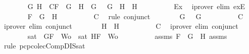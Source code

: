 \begin{isabellebody}
\ \ \ \ \ \ \isamarkupfalse%
\ G{}\ H{}\ \ C{}{\isacharcolon}{\isachardoublequoteopen}F\ {\isacharequal}\ G{}\ \isactrlbold {\isasymrightarrow}\ H{}\ {\isasymand}\ G\ {\isacharequal}\ \isactrlbold {\isasymnot}\ G{}\ {\isasymand}\ H\ {\isacharequal}\ H{}{\isachardoublequoteclose}\isanewline
\ \ \ \ \ \ \ \ \isamarkupfalse%
\ Ex{}\ \isamarkupfalse%
\ {\isacharparenleft}iprover\ elim{\isacharcolon}\ exE{\isacharparenright}\isanewline
\ \ \ \ \ \ \isamarkupfalse%
\ {\isachardoublequoteopen}F\ {\isacharequal}\ G{}\ \isactrlbold {\isasymrightarrow}\ H{}{\isachardoublequoteclose}\isanewline
\ \ \ \ \ \ \ \ \isamarkupfalse%
\ C{}\ \isamarkupfalse%
\ {\isacharparenleft}rule\ conjunct{}{\isacharparenright}\isanewline
\ \ \ \ \ \ \isamarkupfalse%
\ {\isachardoublequoteopen}G\ {\isacharequal}\ \isactrlbold {\isasymnot}\ G{}{\isachardoublequoteclose}\isanewline
\ \ \ \ \ \ \ \ \isamarkupfalse%
\ C{}\ \isamarkupfalse%
\ {\isacharparenleft}iprover\ elim{\isacharcolon}\ conjunct{}{\isacharparenright}\isanewline
\ \ \ \ \ \ \isamarkupfalse%
\ {\isachardoublequoteopen}H\ {\isacharequal}\ H{}{\isachardoublequoteclose}\isanewline
\ \ \ \ \ \ \ \ \isamarkupfalse%
\ C{}\ \isamarkupfalse%
\ {\isacharparenleft}iprover\ elim{\isacharcolon}\ conjunct{}{\isacharparenright}\isanewline
\ \ \ \ \ \ \isamarkupfalse%
\ {\isachardoublequoteopen}sat\ {\isacharparenleft}{\isacharbraceleft}\isactrlbold {\isasymnot}\ G{}{\isacharcomma}F{\isacharbraceright}\ {\isasymunion}\ Wo{\isacharparenright}\ {\isasymor}\ sat\ {\isacharparenleft}{\isacharbraceleft}H{}{\isacharcomma}F{\isacharbraceright}\ {\isasymunion}\ Wo{\isacharparenright}{\isachardoublequoteclose}\isanewline
\ \ \ \ \ \ \ \ \isamarkupfalse%
\ assms{\isacharparenleft}{}{\isacharparenright}\ {\isacartoucheopen}F\ {\isacharequal}\ G{}\ \isactrlbold {\isasymrightarrow}\ H{}{\isacartoucheclose}\ assms{\isacharparenleft}{}{\isacharcomma}{}{\isacharcomma}{}{\isacharparenright}\ \isamarkupfalse%
\ {\isacharparenleft}rule\ pcp{\isacharunderscore}colecComp{\isacharunderscore}DIS{\isacharunderscore}sat{}{\isacharparenright}\isanewline

\end{isabellebody}
